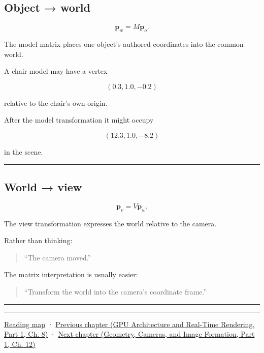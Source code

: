 \subsection{Object → world}\label{03-visual-computing-i-ch012-object-world}

\hypertarget{03-visual-computing-i-ch012-object-world}{}

\[
\mathbf p_w=M\mathbf p_o.
\]

The model matrix places one object's authored coordinates into the common world.

A chair model may have a vertex

\[
(0.3,1.0,-0.2)
\]

relative to the chair's own origin.

After the model transformation it might occupy

\[
(12.3,1.0,-8.2)
\]

in the scene.

\begin{center}\rule{0.5\linewidth}{0.5pt}\end{center}

\subsection{World → view}\label{03-visual-computing-i-ch012-world-view}

\hypertarget{03-visual-computing-i-ch012-world-view}{}

\[
\mathbf p_v=V\mathbf p_w.
\]

The view transformation expresses the world relative to the camera.

Rather than thinking:

\begin{quote}
``The camera moved.''
\end{quote}

The matrix interpretation is usually easier:

\begin{quote}
``Transform the world into the camera's coordinate frame.''
\end{quote}

\begin{center}\rule{0.5\linewidth}{0.5pt}\end{center}

\begin{center}\rule{0.5\linewidth}{0.5pt}\end{center}

\hyperref[volume-reading-map]{Reading map} · \href{../06-GPU-Architecture-and-Real-Time-Rendering-P01/main.pdf\#nameddest=03-visual-computing-i-ch011-bvh-traversal-and-deterministic-evidence}{Previous chapter (GPU Architecture and Real-Time Rendering, Part 1, Ch. 8)} · \href{../03-Geometry-Cameras-and-Image-Formation-P01/main.pdf\#nameddest=03-visual-computing-i-ch013-from-view-space-to-clip-space}{Next chapter (Geometry, Cameras, and Image Formation, Part 1, Ch. 12)}
